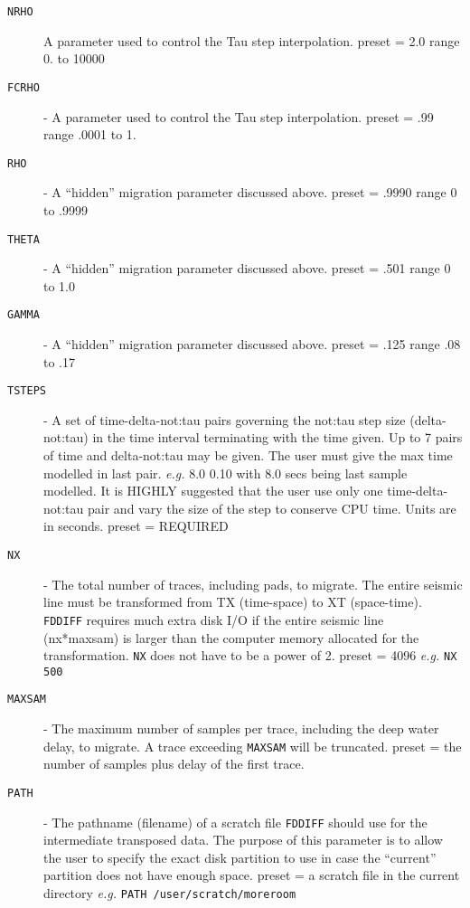 \begin{description}
\item[\texttt{NRHO}] A parameter used to control the Tau step interpolation.
         \Gls{preset} = 2.0   range 0. to 10000

\item[\texttt{FCRHO}]   - A parameter used to control the Tau step interpolation.
         \Gls{preset} = .99   range .0001 to 1.

\item[\texttt{RHO}]     - A ``hidden'' migration parameter discussed above.
         \Gls{preset} = .9990   range  0 to .9999

\item[\texttt{THETA}]   - A ``hidden'' migration parameter discussed above.
         \Gls{preset} = .501  range  0 to 1.0

\item[\texttt{GAMMA}]   - A ``hidden'' migration parameter discussed above.
         \Gls{preset} = .125   range  .08 to .17

\item[\texttt{TSTEPS}]  - A set of time-delta-\gls{not:tau} pairs governing the \gls{not:tau} step size
         (delta-\gls{not:tau}) in the time interval terminating with the time given.
         Up to 7 pairs of time and delta-\gls{not:tau} may be given.  The user must
         give the max time modelled in last pair. \textit{e.g.} 8.0 0.10 with 8.0
         secs being last sample modelled. It is HIGHLY suggested that the
         user use only one time-delta-\gls{not:tau} pair and vary the size of the
         step to conserve CPU time.  Units are in seconds.
         \Gls{preset} = REQUIRED

\item[\texttt{NX}]      - The total number of traces, including pads, to migrate.  The
         entire seismic line must be transformed from TX (time-space) to
         XT (space-time).  \texttt{FDDIFF} requires much extra disk I/O if the
         entire seismic line (nx*maxsam) is larger than the computer
         memory allocated for the transformation.  \texttt{NX} does not have to
         be a power of 2.
         \Gls{preset} = 4096 \textit{e.g.} \texttt{NX 500}

\item[\texttt{MAXSAM}]  - The maximum number of samples per trace, including the deep
         water delay, to migrate. A trace exceeding \texttt{MAXSAM} will be
         truncated.
         \Gls{preset} = the number of samples plus delay of the first trace.

\item[\texttt{PATH}]    - The pathname (filename) of a scratch file \texttt{FDDIFF} should use for
         the intermediate transposed data.  The purpose of this parameter
         is to allow the user to specify the exact disk partition to use
         in case the ``current'' partition does not have enough space.
         \Gls{preset} = a scratch file in the current directory
         \textit{e.g.}    \texttt{PATH /user/scratch/moreroom}
\end{description}

